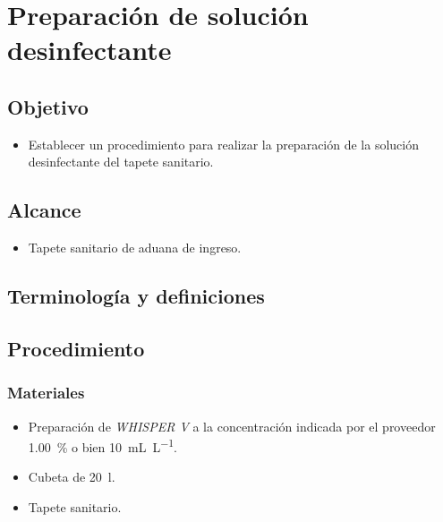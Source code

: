 \thispagestyle{formato-PI}
\renewcommand{\MenorVer}{0}
\renewcommand{\MayorVer}{2}
\renewcommand{\Codigo}{HYS-9-IT}
\renewcommand{\FechaPub}{2023--01}
\renewcommand{\Titulo}{Preparación de solución desinfectante}

\section{\Titulo}

\subsection{Objetivo}
\begin{itemize}
	\item Establecer un procedimiento para realizar la preparación de la solución desinfectante del tapete sanitario.
\end{itemize}

\subsection{Alcance}
\begin{itemize}
	\item Tapete sanitario de aduana de ingreso.
\end{itemize}

\subsection{Terminología y definiciones}

\begin{description}
\end{description}

\subsection{Procedimiento}

\subsubsection{Materiales}
\begin{itemize}
	\item Preparación de \emph{WHISPER V} a la concentración indicada por el proveedor \qty{1.00}{\percent} o bien \qty{10}{\milli\liter\per\liter}.
	\item Cubeta de \qty{20}{\litre}.
	\item Tapete sanitario.
\end{itemize}


